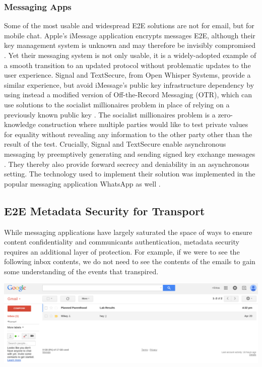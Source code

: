 \documentclass[pageno]{jpaper}
\begin{document}
\subsubsection{Messaging Apps}
Some of the most usable and widespread E2E solutions are not for email, but for mobile chat. Apple's iMessage application encrypts messages E2E, although their key management system is unknown and may therefore be invisibly compromised \cite{imessage}. Yet their messaging system is not only usable, it is a widely-adopted example of a smooth transition to an updated protocol without problematic updates to the user experience. Signal and TextSecure, from Open Whisper Systems, provide a similar experience, but avoid iMessage's public key infrastructure dependency by using instead a modified version of Off-the-Record Messaging (OTR), which can use solutions to the socialist millionaires problem in place of relying on a previously known public key \cite{borisov2004off}. The socialist millionaires problem is a zero-knowledge construction where multiple parties would like to test private values for equality without revealing any information to the other party other than the result of the test. Crucially, Signal and TextSecure enable asynchronous messaging by preemptively generating and sending signed key exchange messages \cite{whisper}. They thereby also provide forward secrecy and deniability in an asynchronous setting. The technology used to implement their solution was implemented in the popular messaging application WhatsApp as well \cite{whatsapp}.


\subsection{E2E Metadata Security for Transport}
While messaging applications have largely saturated the space of ways to ensure content confidentiality and communicants authentication, metadata security requires an additional layer of protection. For example, if we were to see the following inbox contents, we do not need to see the contents of the emails to gain some understanding of the events that transpired.

\includegraphics[width=\textwidth]{planned}
\end{document}
